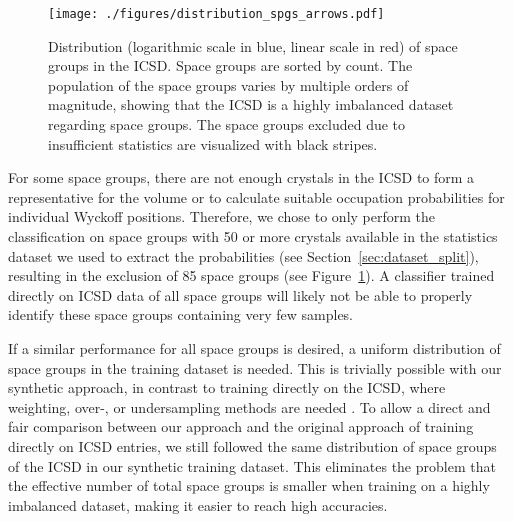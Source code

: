     \begin{figure}[h]
    \centering
    \texttt{[image: ./figures/distribution\_spgs\_arrows.pdf]}
    \caption{Distribution (logarithmic scale in blue, linear scale in red)
    of space groups in the ICSD. Space groups are sorted by count. The population of the space groups varies by
    multiple orders of magnitude, showing that the ICSD is a highly imbalanced
    dataset regarding space groups. The space groups excluded due to insufficient
    statistics are visualized with black stripes. }
    \label{fig:histogram_dist_spgs}
    \end{figure}
   
    For some space groups, there are not enough crystals in the ICSD to form a
    representative  for the volume or to calculate suitable occupation
    probabilities for individual Wyckoff positions. Therefore, we chose to only
    perform the classification on space groups with 50 or more crystals
    available in the statistics dataset we used to extract the probabilities
    (see Section~\ref{sec:dataset_split}), resulting in the exclusion of 85
    space groups (see Figure~\ref{fig:histogram_dist_spgs}). A classifier trained directly on ICSD data of all space groups will likely not be able to properly identify these space
    groups containing very few samples.

    If a similar performance for all space groups is desired, a uniform
    distribution of space groups in the training dataset is needed. This is
    trivially possible with our synthetic approach, in contrast to training
    directly on the ICSD, where weighting, over-, or undersampling methods are
    needed \supercite{sunClassificationImbalancedData2009}. To allow a direct
    and fair comparison between our approach and the original approach of
    training directly on ICSD entries, we still followed the same distribution
    of space groups of the ICSD in our synthetic training dataset. This
    eliminates the problem that the effective number of total space groups is
    smaller when training on a highly imbalanced dataset, making it easier to
    reach high accuracies.

